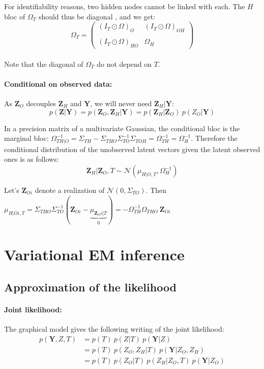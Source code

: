 \documentclass[11pt,a4paper]{article}
\newcommand{\Ybf}{\boldsymbol{Y}}
\newcommand{\Zbf}{\boldsymbol{Z}}
\begin{document}
For identifiability reasons, two hidden nodes cannot be linked with each. The $H$ bloc of $\Omega_T$ should thus be diagonal , and we get: 
\[
 \Omega_T=
  \left( {\begin{array}{cc}
 (I_T \odot \Omega)_O &  (I_T \odot \Omega)_{OH}\\\\
 (I_T \odot \Omega)_{HO} &   \Omega_H 
  \end{array} } \right) \]\\
  
  Note that the diagonal of $\Omega_T$ do not depend on $T$.
  
\paragraph{Conditional on observed data:\\}


As $\Zbf_O$ decouples $\Zbf_H$ and $\Ybf$, we will never need $\Zbf_H|\Ybf$:
$$ p(\Zbf|\Ybf) = p(\Zbf_O,\Zbf_H | \Ybf) = p(\Zbf_H|\Zbf_O) \: p(Z_O|\Ybf) $$




 In a precision matrix of a multivariate Gaussian, the conditional bloc is the marginal bloc:  $\Omega_{TH|O}^{-1} = \Sigma_{TH} -\Sigma_{THO}\Sigma_{TO}^{-1}\Sigma_{TOH} = \Omega_{TH}^{-1} =\Omega_{H}^{-1}$. Therefore the conditional distribution of the unobserved latent vectors given the latent observed ones is as follows: $$\Zbf_H|\Zbf_O,T \sim \mathcal{N}(\mu_{H|O,T}, \Omega_{H}^{-1})$$ 

  Let's $\Zbf_{Oi}$ denote a realization of $\mathcal{N}(0,\Sigma_{TO}) $. Then $\displaystyle  \mu_{H|Oi,T} = \Sigma_{THO}\Sigma_{TO}^{-1}(\Zbf_{Oi}-\underbrace{\mu_{\Zbf_Oi|T}}_{0}) 
 = -\Omega_{TH}^{-1}\Omega_{THO} \: \Zbf_{Oi}
$ 


\section{Variational EM inference}
\subsection{Approximation of the likelihood}
\paragraph{Joint likelihood:}
The graphical model gives the following writing of the joint likelihood:
\begin{align*}
p(\Ybf,Z,T)& = p(T) \: p(Z|T) \: p(\Ybf|Z) \\
&= p(T)\: p(Z_O,Z_H|T) \: p(\Ybf|Z_O,Z_H) \\
&= p(T) \: p(Z_O|T) \: p(Z_H | Z_O,T)  \: p(\Ybf|Z_O)
\end{align*} 
\end{document}

